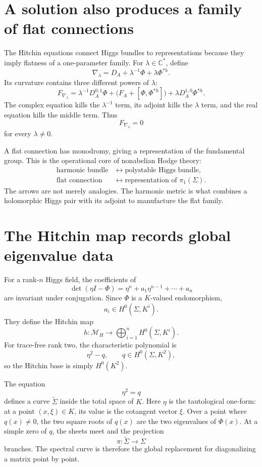 \section{A solution also produces a family of flat connections}

The Hitchin equations connect Higgs bundles to representations because they imply flatness of a one-parameter family.  For \(\lambda\in\mathbb C^*\), define
\[
  \nabla_\lambda
  =D_A+\lambda^{-1}\Phi+\lambda\Phi^{*h}.
\]
Its curvature contains three different powers of \(\lambda\):
\[
  F_{\nabla_\lambda}
  =\lambda^{-1}D_A^{0,1}\Phi
   +\bigl(F_A+[\Phi,\Phi^{*h}]\bigr)
   +\lambda D_A^{1,0}\Phi^{*h}.
\]
The complex equation kills the \(\lambda^{-1}\) term, its adjoint kills the \(\lambda\) term, and the real equation kills the middle term.  Thus
\[
  F_{\nabla_\lambda}=0
\]
for every \(\lambda\ne0\).

A flat connection has monodromy, giving a representation of the fundamental group.  This is the operational core of nonabelian Hodge theory:
\[
\begin{aligned}
  \text{harmonic bundle}
  &\longleftrightarrow
  \text{polystable Higgs bundle},\\
  \text{flat connection}
  &\longleftrightarrow
  \text{representation of }\pi_1(\Sigma).
\end{aligned}
\]
The arrows are not merely analogies.  The harmonic metric is what combines a holomorphic Higgs pair with its adjoint to manufacture the flat family.

\section{The Hitchin map records global eigenvalue data}

For a rank-\(n\) Higgs field, the coefficients of
\[
  \det(\eta I-\Phi)
  =\eta^n+a_1\eta^{n-1}+\cdots+a_n
\]
are invariant under conjugation.  Since \(\Phi\) is a \(K\)-valued endomorphism,
\[
  a_i\in H^0(\Sigma,K^i).
\]
They define the Hitchin map
\[
  h:\mathcal M_H
  \longrightarrow
  \bigoplus_{i=1}^nH^0(\Sigma,K^i).
\]
For trace-free rank two, the characteristic polynomial is
\[
  \eta^2-q,
  \qquad q\in H^0(\Sigma,K^2),
\]
so the Hitchin base is simply \(H^0(K^2)\).

The equation
\[
  \eta^2=q
\]
defines a curve \(\widetilde\Sigma\) inside the total space of \(K\).  Here \(\eta\) is the tautological one-form: at a point \((x,\xi)\in K\), its value is the cotangent vector \(\xi\).  Over a point where \(q(x)\ne0\), the two square roots of \(q(x)\) are the two eigenvalues of \(\Phi(x)\).  At a simple zero of \(q\), the sheets meet and the projection
\[
  \pi:\widetilde\Sigma\to\Sigma
\]
branches.  The spectral curve is therefore the global replacement for diagonalizing a matrix point by point.

